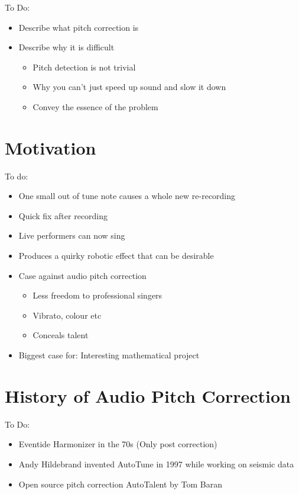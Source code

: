 
\color{red}
To Do:
\begin{itemize}
	\item Describe what pitch correction is
	\item Describe why it is difficult
	\begin{itemize}
		\item Pitch detection is not trivial
		\item Why you can't just speed up sound and slow it down
		\item Convey the essence of the problem
	\end{itemize}
\end{itemize}
\color{black}

\section{Motivation}

\color{red}
To do:
\begin{itemize}
	\item One small out of tune note causes a whole new re-recording
	\item Quick fix after recording
	\item Live performers can now sing
	\item Produces a quirky robotic effect that can be desirable
	\item Case against audio pitch correction
	\begin{itemize}
		\item Less freedom to professional singers
		\item Vibrato, colour etc
		\item Conceals talent
	\end{itemize}
	\item Biggest case for: Interesting mathematical project
\end{itemize}
\color{black}

\section{History of Audio Pitch Correction}

\color{red}
To Do:
\begin{itemize}
	\item Eventide Harmonizer in the 70s (Only post correction)
	\item Andy Hildebrand invented AutoTune in 1997 while working on seismic data
	\item Open source pitch correction AutoTalent by Tom Baran
\end{itemize}
\color{black}
